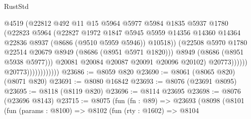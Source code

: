 \begin{lexlean}{RustStd}
\begin{coremodule}
                                          @4519
                                          (@22812
                                            @492
                                            @11
                                            @15
                                            @5964
                                            @5977
                                            @5984
                                            @1835
                                            @5937
                                            @1780
                                            (@22823
                                              @5964
                                              (@22827
                                                @1972
                                                @1847
                                                @5945
                                                @5959
                                                @14356
                                                @14360
                                                @14364
                                                @22836
                                                @8937
                                                (@8686 (@9510 @5959 @5946))
                                                @10518))
                                            (@22508
                                              @5970
                                              @1780
                                              @22514
                                              @20679
                                              @8949
                                              (@8686 (@8951 @5971 @1820)))
                                            @8949
                                            (@8686 (@8951 @5938 @5977)))
                                          @20081
                                          @20084
                                          @20087
                                          @20091
                                          @20096
                                          @20102)
                                        @20773))))))
                            @20773))))))))))))
@23686 := @8059 @820
@23690 := @8061 (@8065 @820) (@8071 @820)
@23691 := @8080 @16842
@23693 := @8076 (@23691 @8095)
@23695 := @8118 (@8119 @820)
@23696 := @8114 @23695
@23698 := @8076 (@23696 @8143)
@23715 := @8075
    (fun (fn : @89) =>
    @23693
      (@8098
        (@8101
          (fun (params : @8100) =>
          @8102
            (fun (rty : @1602) =>
            @8104

\end{coremodule}
\end{lexlean}
